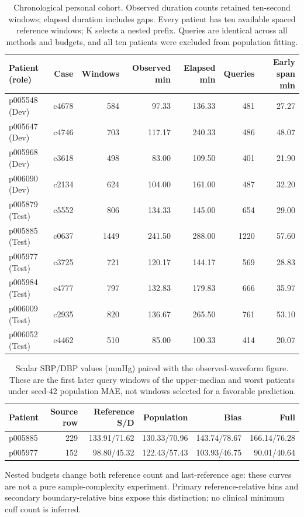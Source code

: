 \documentclass[11pt]{article}
\begin{document}
\begin{table}[!htbp]\centering\scriptsize
\begin{tabular}{lrrrrrr}\toprule
Patient (role) & Case & Windows & Observed min & Elapsed min & Queries & Early span min\\\midrule
p005548 (Dev) & c4678 & 584 & 97.33 & 136.33 & 481 & 27.27\\
p005647 (Dev) & c4746 & 703 & 117.17 & 240.33 & 486 & 48.07\\
p005968 (Dev) & c3618 & 498 & 83.00 & 109.50 & 401 & 21.90\\
p006090 (Dev) & c2134 & 624 & 104.00 & 161.00 & 487 & 32.20\\
p005879 (Test) & c5552 & 806 & 134.33 & 145.00 & 654 & 29.00\\
p005885 (Test) & c0637 & 1449 & 241.50 & 288.00 & 1220 & 57.60\\
p005977 (Test) & c3725 & 721 & 120.17 & 144.17 & 569 & 28.83\\
p005984 (Test) & c4777 & 797 & 132.83 & 179.83 & 666 & 35.97\\
p006009 (Test) & c2935 & 820 & 136.67 & 265.50 & 761 & 53.10\\
p006052 (Test) & c4462 & 510 & 85.00 & 100.33 & 414 & 20.07\\
\bottomrule\end{tabular}
\caption{Chronological personal cohort. Observed duration counts retained ten-second windows; elapsed duration includes gaps. Every patient has ten available spaced reference windows; K selects a nested prefix. Queries are identical across all methods and budgets, and all ten patients were excluded from population fitting.}\end{table}

\begin{table}[!htbp]\centering\small
\begin{tabular}{lrrrrr}\toprule
Patient & Source row & Reference S/D & Population & Bias & Full\\\midrule
p005885 & 229 & 133.91/71.62 & 130.33/70.96 & 143.74/78.67 & 166.14/76.28\\
p005977 & 152 & 98.80/45.32 & 122.43/57.43 & 103.93/46.75 & 90.01/40.64\\
\bottomrule\end{tabular}
\caption{Scalar SBP/DBP values (mmHg) paired with the observed-waveform figure. These are the first later query windows of the upper-median and worst patients under seed-42 population MAE, not windows selected for a favorable prediction.}\end{table}
Nested budgets change both reference count and last-reference age: these curves are not a pure sample-complexity experiment. Primary reference-relative bins and secondary boundary-relative bins expose this distinction; no clinical minimum cuff count is inferred.
\end{document}
